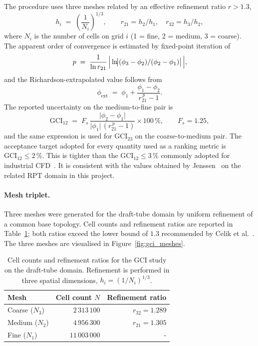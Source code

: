 The procedure uses three meshes related by an effective refinement ratio $r > 1.3$,
\begin{equation}
h_i \;=\; \!\left(\frac{1}{N_i}\right)^{1/3}, \qquad
r_{21} = h_2 / h_1, \quad r_{32} = h_3 / h_2,
\label{eq:GCI_h_r}
\end{equation}
where $N_i$ is the number of cells on grid $i$ (1 = fine, 2 = medium, 3 = coarse). The apparent order of convergence is estimated by fixed-point iteration of
\begin{equation}
p \;=\; \frac{1}{\ln r_{21}} \,\Bigl|\,\ln\!\bigl|(\phi_3 - \phi_2)/(\phi_2 - \phi_1)\bigr|\,\Bigr|,
\label{eq:GCI_p}
\end{equation}
and the Richardson-extrapolated value follows from
\begin{equation}
\phi_{\mathrm{ext}} \;=\; \phi_1 + \frac{\phi_1 - \phi_2}{r_{21}^{\,p} - 1}.
\label{eq:GCI_extrap}
\end{equation}
The reported uncertainty on the medium-to-fine pair is
\begin{equation}
\mathrm{GCI}_{12} \;=\; F_s\,\frac{\bigl|\phi_2 - \phi_1\bigr|}{\bigl|\phi_1\bigr|\,(r_{21}^{\,p} - 1)} \times 100\,\%, \qquad F_s = 1.25,
\label{eq:GCI_def}
\end{equation}
and the same expression is used for $\mathrm{GCI}_{23}$ on the coarse-to-medium pair. The acceptance target adopted for every quantity used as a ranking metric is $\mathrm{GCI}_{12} \leq 2\,\%$. This is tighter than the $\mathrm{GCI}_{12} \leq 3\,\%$ commonly adopted for industrial CFD~\cite{Celik2008}. It is consistent with the values obtained by Jenssen~\cite{Jenssen2020} on the related RPT domain in this project.

\paragraph{Mesh triplet.}
Three meshes were generated for the draft-tube domain by uniform refinement of a common base topology. Cell counts and refinement ratios are reported in Table~\ref{tab:gci_meshes}; both ratios exceed the lower bound of $1.3$ recommended by Celik et al.~\cite{Celik2008}. The three meshes are visualised in Figure~\ref{fig:gci_meshes}.

\begin{table}[h!]
  \centering
  \caption[Mesh triplet for the GCI study]{Cell counts and refinement ratios for the GCI study on the draft-tube domain. Refinement is performed in three spatial dimensions, $h_i = (1/N_i)^{1/3}$.}
  \label{tab:gci_meshes}
  \small
  \begin{tabular}{l r r}
    \toprule
    \textbf{Mesh}  & \textbf{Cell count $N$}  & \textbf{Refinement ratio} \\
    \midrule
    Coarse ($N_3$) & $2\,313\,100$            & $r_{32} = 1.289$ \\
    Medium ($N_2$) & $4\,956\,300$            & $r_{21} = 1.305$ \\
    Fine   ($N_1$) & $11\,003\,000$           & - \\
    \bottomrule
  \end{tabular}
\end{table}

